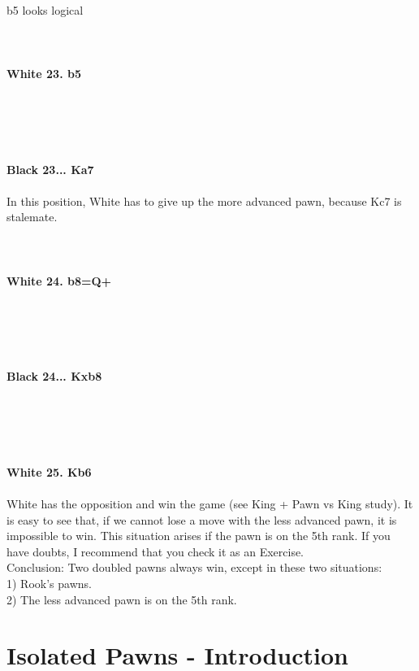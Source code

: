 \documentclass{article}
\begin{document}
\\
b5 looks logical\\
\\

\\
\\
\textbf{White 23. b5}\\
\\
\\
\\

\\
\\
\textbf{Black 23... Ka7}\\
\\
In this position, White has to give up the more advanced pawn, because Kc7 is stalemate.\\
\\

\\
\\
\textbf{White 24. b8=Q+}\\
\\
\\
\\

\\
\\
\textbf{Black 24... Kxb8}\\
\\
\\
\\

\\
\\
\textbf{White 25. Kb6}\\
\\
White has the opposition and win the game (see King + Pawn vs King study). It is easy to see that, if we cannot lose a move with the less advanced pawn, it is impossible to win. This situation arises if the pawn is on the 5th rank. If you have doubts, I recommend that you check it as an Exercise.\\Conclusion: Two doubled pawns always win, except in these two situations:\\1) Rook's pawns.\\2) The less advanced pawn is on the 5th rank.\section{ Isolated Pawns - Introduction}
\end{document}

